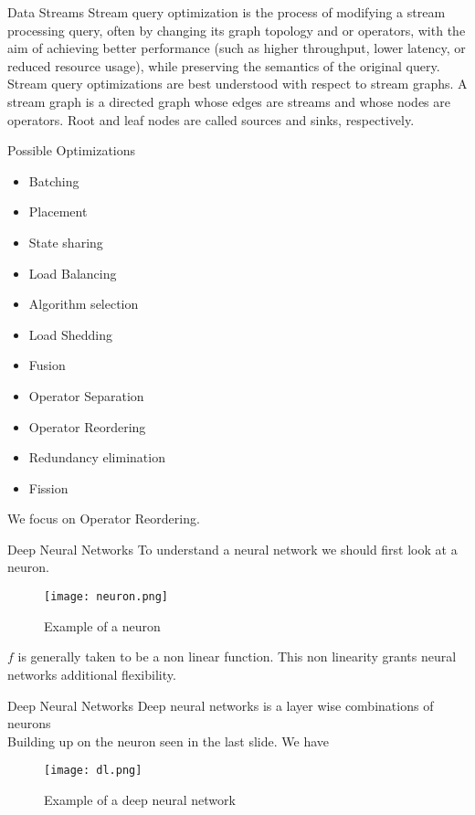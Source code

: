 \begin{frame}{Data Streams}
    Stream query optimization is the process of modifying a stream processing query, often by changing  its  graph  topology  and or  operators,  with the  aim  of  achieving  better  performance  (such as  higher  throughput,  lower  latency,  or  reduced resource usage), while preserving the semantics of the original query.\\
    Stream  query  optimizations  are  best  understood  with  respect  to  stream  graphs.  A stream graph is a directed graph whose edges are streams and  whose  nodes  are  operators.  Root  and  leaf nodes are called sources and sinks, respectively.
\end{frame}

\begin{frame}{Possible Optimizations}
    \begin{itemize}
        \item Batching
        \item Placement
        \item State sharing
        \item Load Balancing
        \item Algorithm selection
        \item Load Shedding
        \item Fusion
        \item Operator Separation
        \item Operator Reordering
        \item Redundancy elimination
        \item Fission
    \end{itemize}
    We focus on Operator Reordering.
\end{frame}

\begin{frame}{Deep Neural Networks}
    To understand a neural network we should first look at a neuron. 
    \begin{figure}
        \centering
        \texttt{[image: neuron.png]}\\
        \caption{Example of a neuron}
        \label{fig:neuron}
    \end{figure}
    $f$ is generally taken to be a non linear function. This non linearity grants neural networks additional flexibility.
\end{frame}


\begin{frame}{Deep Neural Networks}
    Deep neural networks is a layer wise combinations of neurons\\
    Building up on the neuron seen in the last slide. We have
    \begin{figure}
        \centering
        \texttt{[image: dl.png]}\\
        \caption{Example of a deep neural network}
        \label{fig:dl}
    \end{figure}
\end{frame}

